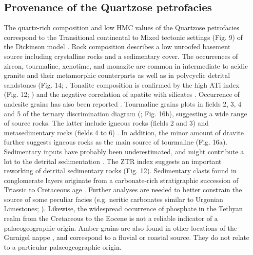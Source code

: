 \documentclass[twoside]{article}
\begin{document}

\subsection{Provenance of the Quartzose petrofacies}

The quartz-rich composition and low HMC values of the Quartzose petrofacies correspond to the Transitional continental to Mixed tectonic settings (Fig. 9) of the Dickinson model \citep{Dickinson1985,Dickinson1979a}. Rock composition describes a low unroofed basement source including crystalline rocks and a sedimentary cover. The occurrences of zircon, tourmaline, xenotime, and monazite are common in intermediate to acidic granite and their metamorphic counterparts as well as in polycyclic detrital sandstones (Fig. 14; \citealp{Mange1992,Stefani2007,Eynatten2012}. Tonalite composition is confirmed by the high ATi index (Fig. 12; \citealp{Butler2011}) and the negative correlation of apatite with silicates \citep{Eynatten2012}. Occurrence of andesite grains has also been reported \citep{Ospina-Ostios2013}. Tourmaline grains plots in fields 2, 3, 4 and 5 of the ternary discrimination diagram (\citealp{Henry1985}; Fig. 16b), suggesting a wide range of source rocks. The latter include igneous rocks (fields 2 and 3) and metasedimentary rocks (fields 4 to 6) \cite{Henry1985,Mange1992}. In addition, the minor amount of dravite further suggests igneous rocks as the main source of tourmaline (Fig. 16a). Sedimentary inputs have probably been underestimated, and might contribute a lot to the detrital sedimentation \citep{Picard2007}. The ZTR index suggests an important reworking of detrital sedimentary rocks (Fig. 12). Sedimentary clasts found in conglomerate layers originate from a carbonate-rich stratigraphic succession of Triassic to Cretaceous age \citep{Ragusa2015}. Further analyses are needed to better constrain the source of some peculiar facies (e.g. neritic carbonates similar to Urgonian Limestones; \citealp{Lombard1940a}). Likewise, the widespread occurrence of phosphate in the Tethyan realm from the Cretaceous to the Eocene \citep{Broudoux1985,Notholt1989,Follmi1990} is not a reliable indicator of a palaeogeographic origin. Amber grains are also found in other locations of the Gurnigel nappe \citep{Tercier1928a}, and correspond to a fluvial or coastal source. They do not relate to a particular palaeogeographic origin.\par
\end{document}
